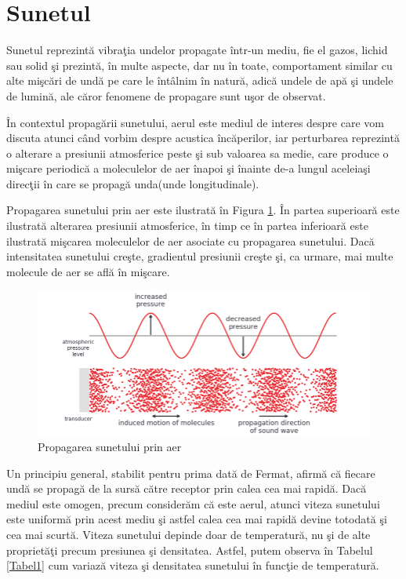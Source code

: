 	\section{Sunetul}
	Sunetul reprezint\u{a} vibra\c{t}ia undelor propagate \^{i}ntr-un mediu, fie el gazos, lichid sau solid \c{s}i prezint\u{a}, \^{i}n multe aspecte, dar nu \^{i}n toate, comportament similar cu alte mi\c{s}c\u{a}ri de und\u{a} pe care le \^{i}nt\^{a}lnim \^{i}n natur\u{a}, adic\u{a} undele de ap\u{a} \c{s}i undele de lumin\u{a}, ale c\u{a}ror fenomene de propagare sunt u\c{s}or de
	observat.
	\bigskip
	
	\^{I}n contextul propag\u{a}rii sunetului, aerul este mediul de interes despre care vom discuta atunci c\^{a}nd vorbim despre acustica \^{i}nc\u{a}perilor, iar perturbarea reprezint\u{a} o alterare a presiunii atmosferice peste \c{s}i sub valoarea sa medie, care produce o mi\c{s}care periodic\u{a} a moleculelor de aer \^{i}napoi \c{s}i \^{i}nainte de-a lungul aceleia\c{s}i direc\c{t}ii \^{i}n care se propag\u{a} unda(unde longitudinale).
	\bigskip
	
	Propagarea sunetului prin aer este ilustrat\u{a} în Figura \ref{Fig1}. \^{I}n partea superioar\u{a}
	este ilustrat\u{a} alterarea presiunii atmosferice, \^{i}n timp ce \^{i}n partea inferioar\u{a} este ilustrat\u{a} mi\c{s}carea moleculelor de aer asociate cu propagarea sunetului. Dac\u{a} intensitatea
	sunetului cre\c{s}te, gradientul presiunii cre\c{s}te \c{s}i, ca urmare, mai multe
	molecule de aer se afl\u{a} \^{i}n mi\c{s}care.
	
	\begin{figure}[!htb]
		\centering
		\includegraphics[width=12cm]{imagini/propagareaSunetuluiInAer.png}
		\caption{Propagarea sunetului prin aer\cite{elorza}}
		\label{Fig1}
	\end{figure}

	Un principiu general, stabilit pentru prima dat\u{a} de Fermat, afirm\u{a} c\u{a} fiecare und\u{a} se propag\u{a} de la surs\u{a} c\u{a}tre receptor prin calea cea mai rapid\u{a}. Dac\u{a} mediul este omogen, precum consider\u{a}m c\u{a} este aerul, atunci viteza sunetului este uniform\u{a} prin acest mediu \c{s}i astfel calea cea mai rapid\u{a} devine totodat\u{a} \c{s}i cea mai scurt\u{a}.
	Viteza sunetului depinde doar de temperatur\u{a}, nu \c{s}i de alte propriet\u{a}\c{t}i precum presiunea \c{s}i densitatea. Astfel, putem observa \^{i}n Tabelul \ref{Tabel1} cum variaz\u{a} viteza \c{s}i densitatea sunetului \^{i}n func\c{t}ie de temperatur\u{a}.
	
